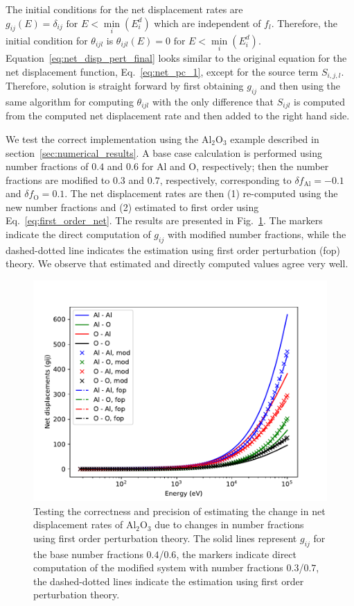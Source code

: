 \documentclass[review]{elsarticle}
\begin{document}
The initial conditions for the net displacement rates are $g_{ij}(E) = \delta_{ij} \text{ for } E< \min\limits_{i} (E_i^d)$ which are independent of $f_l$. Therefore, the initial condition for $\theta_{ijl}$ is $\theta_{ijl}(E) = 0 \text{ for } E< \min\limits_{i} (E_i^d)$. Equation~\ref{eq:net_disp_pert_final} looks  similar to the original equation for the net displacement function, Eq.~\ref{eq:net_pc_1}, except for the source term $S_{i,j,l}$. Therefore, solution is straight forward by first obtaining $g_{ij}$ and then using the same algorithm for computing $\theta_{ijl}$ with the only difference that $S_{ijl}$ is computed from the computed net displacement rate and then added to the right hand side.

We test the correct implementation using the $\text{Al}_2\text{O}_3$ example described in section~\ref{sec:numerical_results}. A base case calculation is performed using number fractions of $0.4$ and $0.6$ for Al and O, respectively; then the number fractions are modified to $0.3$ and $0.7$, respectively, corresponding to $\delta f_{\text{Al}} = -0.1$ and $\delta f_{\text{O}} = 0.1$.  The net displacement rates are then (1) re-computed using the new number fractions and (2) estimated to first order using Eq.~\ref{eq:first_order_net}. The results are presented in Fig.~\ref{fig:fop_Al2O3}. The markers indicate the direct computation of $g_{ij}$ with modified number fractions, while the dashed-dotted line indicates the estimation using first order perturbation (fop) theory. We observe that estimated and directly computed values agree very well. 

\begin{figure}[p]
	\centering
	\includegraphics[width=1\linewidth]{comparison_parkin_coulter_Al2O3_first_order_perturbation/NRT_first_order_perturbation_theory.pdf}
	\caption{Testing the correctness and precision of estimating the change in net displacement rates of $\text{Al}_2\text{O}_3$ due to changes in number fractions using first order perturbation theory. The solid lines represent $g_{ij}$ for the base number fractions $0.4$/$0.6$, the markers indicate direct computation of the modified system with number fractions $0.3$/$0.7$, the dashed-dotted lines indicate the estimation using first order perturbation theory.}
	\label{fig:fop_Al2O3}
\end{figure}
\end{document}
